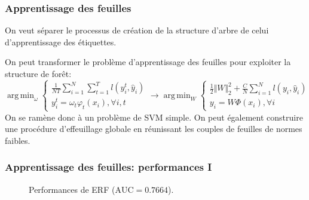\documentclass[dvipsnames,10pt]{beamer}
\DeclareMathOperator*{\argmin}{arg\,min}
\theoremstyle{plain}
\theoremstyle{definition}
\begin{document}
\begin{frame}
\frametitle{Apprentissage des feuilles}
On veut séparer le processus de création de la structure d'arbre de celui d'apprentissage des étiquettes.

On peut transformer le problème d'apprentissage des feuilles pour exploiter la structure de forêt:
\begin{equation*}
\argmin_\omega \begin{cases}
        \frac{1}{N T} \sum_{i=1}^N \sum_{t=1}^T l(y_i^t , \hat{y}_i ) \\
        y_i^t = \omega_t \varphi_t (x_i ) , \forall i , t
\end{cases}
\longrightarrow
\argmin_W \begin{cases}
         \frac{1}{2} \Vert W \Vert^2_2 + \frac{C}{N} \sum_{i=1}^N l(y_i , \hat{y}_i ) \\
        y_i = W \Phi (x_i ) , \forall i
\end{cases}
\end{equation*}
On se ramène donc à un problème de SVM simple. On peut également construire une procédure d'effeuillage globale en réunissant les couples de feuilles de normes faibles.
\end{frame}

\begin{frame}
\frametitle{Apprentissage des feuilles: performances I}
\begin{figure}[H]
    \caption{Performances de ERF ($\mathrm{AUC} = 0.7664$).}
\end{figure}
\end{frame}
\end{document}
